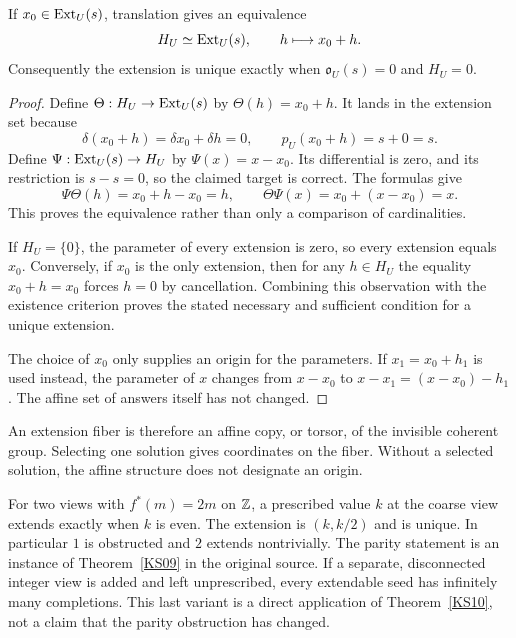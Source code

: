 \begin{theorem}\label{KS10}
If \(x_0\in\operatorname{Ext}_U(s)\), translation gives an equivalence
\[
 H_U\simeq\operatorname{Ext}_U(s),\qquad h\longmapsto x_0+h.
\]
Consequently the extension is unique exactly when \(\mathfrak o_U(s)=0\) and \(H_U=0\).
\end{theorem}
\begin{proof}
Define $\Theta:H_U\to\operatorname{Ext}_U(s)$ by $\Theta(h)=x_0+h$. It lands in the extension set because
\[
 \delta(x_0+h)=\delta x_0+\delta h=0,
 \qquad p_U(x_0+h)=s+0=s.
\]
Define $\Psi:\operatorname{Ext}_U(s)\to H_U$ by $\Psi(x)=x-x_0$. Its differential is zero, and its restriction is $s-s=0$, so the claimed target is correct. The formulas give
\[
 \Psi\Theta(h)=x_0+h-x_0=h,\qquad
 \Theta\Psi(x)=x_0+(x-x_0)=x.
\]
This proves the equivalence rather than only a comparison of cardinalities.

If $H_U=\{0\}$, the parameter of every extension is zero, so every extension equals $x_0$. Conversely, if $x_0$ is the only extension, then for any $h\in H_U$ the equality $x_0+h=x_0$ forces $h=0$ by cancellation. Combining this observation with the existence criterion proves the stated necessary and sufficient condition for a unique extension.

The choice of $x_0$ only supplies an origin for the parameters. If $x_1=x_0+h_1$ is used instead, the parameter of $x$ changes from $x-x_0$ to $x-x_1=(x-x_0)-h_1$. The affine set of answers itself has not changed.
\end{proof}
An extension fiber is therefore an affine copy, or torsor, of the invisible coherent group. Selecting one solution gives coordinates on the fiber. Without a selected solution, the affine structure does not designate an origin.

\begin{example}
For two views with \(f^*(m)=2m\) on \(\mathbb Z\), a prescribed value \(k\) at the coarse view extends exactly when \(k\) is even. The extension is \((k,k/2)\) and is unique. In particular \(1\) is obstructed and \(2\) extends nontrivially. The parity statement is an instance of Theorem~\ref{KS09} in the original source. If a separate, disconnected integer view is added and left unprescribed, every extendable seed has infinitely many completions. This last variant is a direct application of Theorem~\ref{KS10}, not a claim that the parity obstruction has changed.
\end{example}

